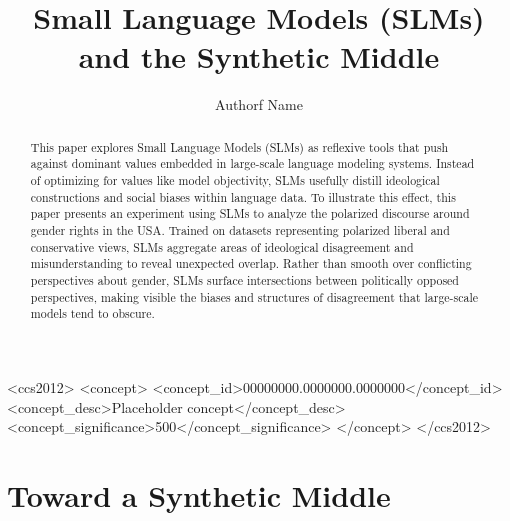 \documentclass[anonymous,review]{acmart}
\begin{document}
\title{Small Language Models (SLMs) and the Synthetic Middle}

\author{Authorf Name}

\renewcommand{\shortauthors}{Author Name}

\begin{abstract}
This paper explores Small Language Models (SLMs) as reflexive tools that push against dominant values embedded in large-scale language modeling systems. Instead of optimizing for values like model objectivity, SLMs usefully distill ideological constructions and social biases within language data. To illustrate this effect, this paper presents an experiment using SLMs to analyze the polarized discourse around gender rights in the USA. Trained on datasets representing polarized liberal and conservative views, SLMs aggregate areas of ideological disagreement and misunderstanding to reveal unexpected overlap. Rather than smooth over conflicting perspectives about gender, SLMs surface intersections between politically opposed perspectives, making visible the biases and structures of disagreement that large-scale models tend to obscure.
\end{abstract}

\begin{CCSXML}
<ccs2012>
 <concept>
  <concept_id>00000000.0000000.0000000</concept_id>
  <concept_desc>Placeholder concept</concept_desc>
  <concept_significance>500</concept_significance>
 </concept>
</ccs2012>
\end{CCSXML}



\maketitle


\section{Toward a Synthetic Middle}
\end{document}
